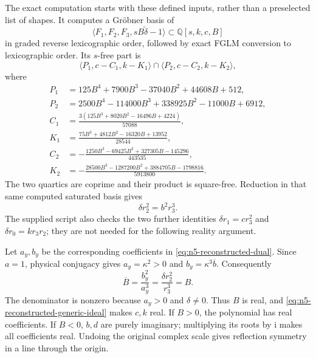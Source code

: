 \documentclass[11pt]{article}
\theoremstyle{remark}
\newcommand{\Q}{\mathbb Q}
\numberwithin{equation}{section}
\begin{document}
The exact computation starts with these defined inputs, rather than a
preselected list of shapes. It computes a Gr\"obner basis of
\[
 \langle F_1,F_2,F_3,sB\widetilde\delta-1\rangle
       \subset\Q[s,k,c,B]
\]
in graded reverse lexicographic order, followed by exact FGLM conversion
to lexicographic order. Its $s$-free part is
\begin{equation}\label{eq:n5-reconstructed-generic-ideal}
 \langle P_1,c-C_1,k-K_1\rangle
 \cap\langle P_2,c-C_2,k-K_2\rangle,
\end{equation}
where
\begin{align*}
P_1&=125B^4+7900B^3-37040B^2+44608B+512,\\
P_2&=2500B^4-114000B^3+338925B^2-11000B+6912,\\
C_1&=\frac{3(125B^3+8020B^2-16496B+4224)}{57088},\\
K_1&=\frac{75B^3+4812B^2-16320B+13952}{28544},\\
C_2&=-\frac{1250B^3-69425B^2+327305B-145296}{443535},\\
K_2&=-\frac{28500B^3-1287200B^2+3884705B-1798816}{5913800}.
\end{align*}
The two quartics are coprime and their product is square-free.
Reduction in that same computed saturated basis gives
\begin{equation}\label{eq:n5-reconstructed-dual-invariant}
 \delta r_2^2=b^2r_3^3.
\end{equation}
The supplied script also checks the two further identities
$\delta r_1=cr_3^2$ and $\delta r_0=kr_3r_2$; they are not needed
for the following reality argument.

Let $a_y,b_y$ be the corresponding coefficients in
\eqref{eq:n5-reconstructed-dual}. Since $a=1$, physical conjugacy gives
$a_y=\kappa^2>0$ and $b_y=\kappa^3\overline b$. Consequently
\[
 \overline B=\frac{b_y^2}{a_y^3}
 =\frac{\delta r_2^2}{r_3^3}=B.
\]
The denominator is nonzero because $a_y>0$ and $\delta\ne0$.
Thus $B$ is real, and \eqref{eq:n5-reconstructed-generic-ideal} makes
$c,k$ real. If $B>0$, the polynomial has real coefficients. If $B<0$,
$b,d$ are purely imaginary; multiplying its roots by $\mathrm i$
makes all coefficients real. Undoing the original complex scale gives
reflection symmetry in a line through the origin.
\end{document}
